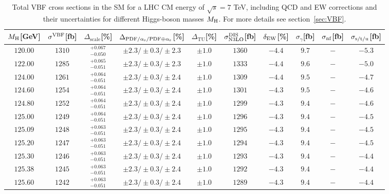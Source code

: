 \begin{table}[ht!]
\caption{Total VBF cross sections in the SM for a LHC CM energy of $\sqrt{s}=7$ TeV, including QCD and EW corrections
and their uncertainties for different Higgs-boson masses $M_\mathrm{H}$. For more details see section~\ref{sec:VBF}.}
\label{tab:vbf_XStot_7}
\begin{center}%
\begin{small}%
\begin{tabular}{cccccccc|cc}%
\toprule
$M_\mathrm{H}$[GeV] & $\sigma^{\mathrm{VBF}}$[fb] & $\Delta_{\mathrm{scale}}$[\%] & $\Delta_{\mathrm{PDF}/\alpha_{\mathrm{s}}/\mathrm{PDF\oplus\alpha_{\mathrm{s}}}}$[\%] & $\Delta_{\mathrm{TU}}$[\%] &
$\sigma_{\mathrm{N3LO}}^{\mathrm{DIS}}$[fb] & $\delta_{\mathrm{EW}}$[\%] & $\sigma_{\gamma}$[fb] & $\sigma_{\mbox{\scriptsize nf}}$[fb] & $\sigma_{\mbox{\scriptsize s/t/u}}$[fb]
\\
\midrule
$120.00$ & $1310$ & $^{+0.067}_{-0.050}$ & $\pm 2.3/\pm 0.3/\pm 2.3$ & $\pm 1.0$ & $1360$ & $-4.4$ & $9.7$ & $-$ & $-5.3$ \\
$122.00$ & $1285$ & $^{+0.065}_{-0.051}$ & $\pm 2.3/\pm 0.3/\pm 2.3$ & $\pm 1.0$ & $1333$ & $-4.4$ & $9.6$ & $-$ & $-5.0$ \\
$124.00$ & $1261$ & $^{+0.064}_{-0.051}$ & $\pm 2.3/\pm 0.3/\pm 2.4$ & $\pm 1.0$ & $1309$ & $-4.4$ & $9.5$ & $-$ & $-4.7$ \\
$124.60$ & $1254$ & $^{+0.064}_{-0.051}$ & $\pm 2.3/\pm 0.3/\pm 2.4$ & $\pm 1.0$ & $1301$ & $-4.3$ & $9.5$ & $-$ & $-4.6$ \\
$124.80$ & $1252$ & $^{+0.064}_{-0.051}$ & $\pm 2.3/\pm 0.3/\pm 2.4$ & $\pm 1.0$ & $1299$ & $-4.3$ & $9.4$ & $-$ & $-4.6$ \\
$125.00$ & $1249$ & $^{+0.064}_{-0.051}$ & $\pm 2.3/\pm 0.3/\pm 2.4$ & $\pm 1.0$ & $1296$ & $-4.3$ & $9.4$ & $-$ & $-4.5$ \\
$125.09$ & $1248$ & $^{+0.063}_{-0.051}$ & $\pm 2.3/\pm 0.3/\pm 2.4$ & $\pm 1.0$ & $1295$ & $-4.3$ & $9.4$ & $-$ & $-4.5$ \\
$125.20$ & $1247$ & $^{+0.063}_{-0.051}$ & $\pm 2.3/\pm 0.3/\pm 2.4$ & $\pm 1.0$ & $1294$ & $-4.3$ & $9.4$ & $-$ & $-4.5$ \\
$125.30$ & $1246$ & $^{+0.063}_{-0.051}$ & $\pm 2.3/\pm 0.3/\pm 2.4$ & $\pm 1.0$ & $1293$ & $-4.3$ & $9.4$ & $-$ & $-4.4$ \\
$125.38$ & $1245$ & $^{+0.063}_{-0.051}$ & $\pm 2.3/\pm 0.3/\pm 2.4$ & $\pm 1.0$ & $1292$ & $-4.3$ & $9.4$ & $-$ & $-4.4$ \\
$125.60$ & $1242$ & $^{+0.063}_{-0.051}$ & $\pm 2.3/\pm 0.3/\pm 2.4$ & $\pm 1.0$ & $1289$ & $-4.3$ & $9.4$ & $-$ & $-4.4$ \\

\end{tabular}
\end{small}
\end{center}
\end{table}
